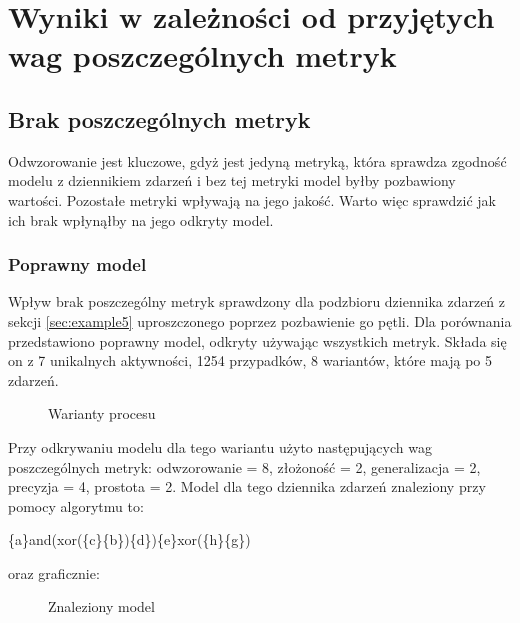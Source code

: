 \section{Wyniki w zależności od przyjętych wag poszczególnych metryk}

\subsection{Brak poszczególnych metryk}
Odwzorowanie jest kluczowe, gdyż jest jedyną metryką, która sprawdza zgodność modelu z dziennikiem zdarzeń i bez tej metryki model byłby pozbawiony wartości. Pozostałe metryki wpływają na jego jakość. Warto więc sprawdzić jak ich brak wpłynąłby na jego odkryty model.

\subsubsection{Poprawny model}
Wpływ brak poszczególny metryk sprawdzony dla podzbioru dziennika zdarzeń z sekcji \ref{sec:example5} uproszczonego poprzez pozbawienie go pętli. Dla porównania przedstawiono poprawny model, odkryty używając wszystkich metryk.
Składa się on z 7 unikalnych aktywności, 1254 przypadków, 8 wariantów, które mają po 5 zdarzeń. 
\begin{figure}[!ht]
	\caption{\label{fig:flow_chart}Warianty procesu}
\end{figure}

Przy odkrywaniu modelu dla tego wariantu użyto następujących wag poszczególnych metryk: odwzorowanie = 8, złożoność = 2, generalizacja = 2, precyzja = 4, prostota = 2. Model dla tego dziennika zdarzeń znaleziony przy pomocy algorytmu to:
\begin{center}
	\{a\}and(xor(\{c\}\{b\})\{d\})\{e\}xor(\{h\}\{g\})
\end{center}
oraz graficznie:

\begin{figure}[!ht]
	\caption{\label{fig:flow_chart}Znaleziony model}
\end{figure}


